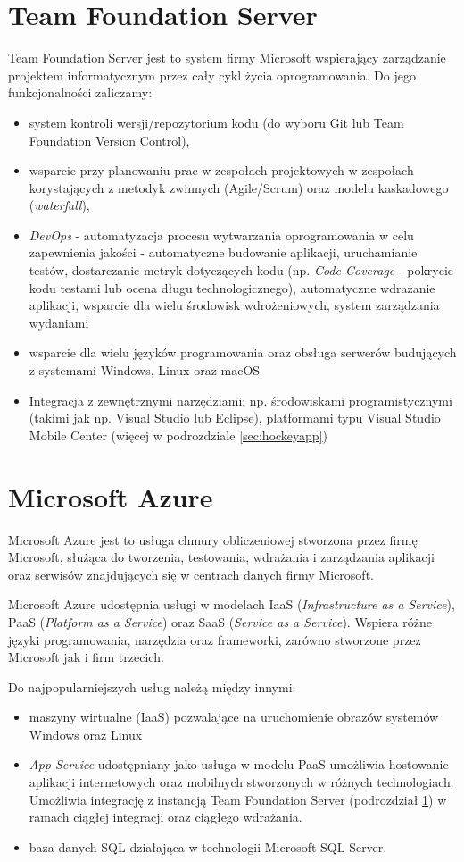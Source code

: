 \section{Team Foundation Server}
\label{sec:team}
Team Foundation Server jest to system firmy Microsoft wspierający zarządzanie projektem informatycznym przez cały cykl życia oprogramowania.
Do jego funkcjonalności zaliczamy:
\begin{itemize}
\item system kontroli wersji/repozytorium kodu (do wyboru Git lub Team Foundation Version Control)\cite{Kontrola99:online},
\item wsparcie przy planowaniu prac w zespołach projektowych w zespołach korystających z metodyk zwinnych (Agile/Scrum) oraz modelu kaskadowego (\textit{waterfall})\cite{Narzedzi82:online},
\item \textit{DevOps} - automatyzacja procesu wytwarzania oprogramowania w celu zapewnienia jakości - automatyczne budowanie aplikacji, uruchamianie testów, dostarczanie metryk dotyczących kodu (np. \textit{Code Coverage} - pokrycie kodu testami lub ocena długu technologicznego), automatyczne wdrażanie aplikacji, wsparcie dla wielu środowisk wdrożeniowych, system zarządzania wydaniami\cite{Ciaglain95:online}
\item wsparcie dla wielu języków programowania oraz obsługa serwerów budujących z systemami Windows, Linux oraz macOS \cite{Buildand77:online}
\item Integracja z zewnętrznymi narzędziami: np. środowiskami programistycznymi (takimi jak np. Visual Studio lub Eclipse), platformami typu Visual Studio Mobile Center (więcej w podrozdziale \ref{sec:hockeyapp})
\end{itemize}
\section{Microsoft Azure}
\label{sec:azure}
Microsoft Azure jest to usługa chmury obliczeniowej stworzona przez firmę Microsoft, służąca do tworzenia, testowania, wdrażania i zarządzania aplikacji oraz serwisów znajdujących się w centrach danych firmy Microsoft.

Microsoft Azure udostępnia usługi w modelach IaaS (\textit{Infrastructure as a Service}), PaaS (\textit{Platform as a Service}) oraz SaaS (\textit{Service as a Service}). Wspiera różne języki programowania, narzędzia oraz frameworki, zarówno stworzone przez Microsoft jak i firm trzecich. 

Do najpopularniejszych usług należą między innymi:
\begin{itemize}
\item maszyny wirtualne (IaaS) pozwalające na uruchomienie obrazów systemów Windows oraz Linux
\item \textit{App Service} udostępniany jako usługa w modelu PaaS umożliwia hostowanie aplikacji internetowych oraz mobilnych stworzonych w różnych technologiach. Umożliwia integrację z instancją Team Foundation Server (podrozdział \ref{sec:team}) w ramach ciągłej integracji oraz ciągłego wdrażania.
\item baza danych SQL działająca w technologii Microsoft SQL Server.
\end{itemize}
